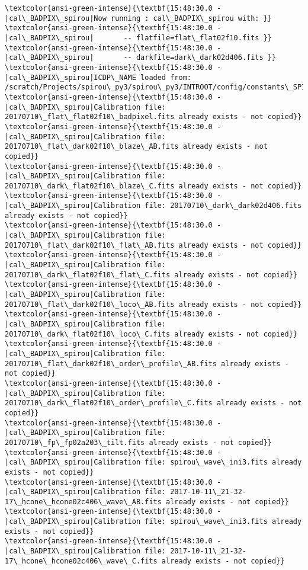\documentclass[11pt]{article}
\begin{document}
    \begin{Verbatim}[commandchars=\\\{\}]
\textcolor{ansi-green-intense}{\textbf{15:48:30.0 -   |cal\_BADPIX\_spirou|Now running : cal\_BADPIX\_spirou with: }}
\textcolor{ansi-green-intense}{\textbf{15:48:30.0 -   |cal\_BADPIX\_spirou|       -- flatfile=flat\_flat02f10.fits }}
\textcolor{ansi-green-intense}{\textbf{15:48:30.0 -   |cal\_BADPIX\_spirou|       -- darkfile=dark\_dark02d406.fits }}
\textcolor{ansi-green-intense}{\textbf{15:48:30.0 -   |cal\_BADPIX\_spirou|ICDP\_NAME loaded from: /scratch/Projects/spirou\_py3/spirou\_py3/INTROOT/config/constants\_SPIROU.py}}
\textcolor{ansi-green-intense}{\textbf{15:48:30.0 -   |cal\_BADPIX\_spirou|Calibration file: 20170710\_flat\_flat02f10\_badpixel.fits already exists - not copied}}
\textcolor{ansi-green-intense}{\textbf{15:48:30.0 -   |cal\_BADPIX\_spirou|Calibration file: 20170710\_flat\_dark02f10\_blaze\_AB.fits already exists - not copied}}
\textcolor{ansi-green-intense}{\textbf{15:48:30.0 -   |cal\_BADPIX\_spirou|Calibration file: 20170710\_dark\_flat02f10\_blaze\_C.fits already exists - not copied}}
\textcolor{ansi-green-intense}{\textbf{15:48:30.0 -   |cal\_BADPIX\_spirou|Calibration file: 20170710\_dark\_dark02d406.fits already exists - not copied}}
\textcolor{ansi-green-intense}{\textbf{15:48:30.0 -   |cal\_BADPIX\_spirou|Calibration file: 20170710\_flat\_dark02f10\_flat\_AB.fits already exists - not copied}}
\textcolor{ansi-green-intense}{\textbf{15:48:30.0 -   |cal\_BADPIX\_spirou|Calibration file: 20170710\_dark\_flat02f10\_flat\_C.fits already exists - not copied}}
\textcolor{ansi-green-intense}{\textbf{15:48:30.0 -   |cal\_BADPIX\_spirou|Calibration file: 20170710\_flat\_dark02f10\_loco\_AB.fits already exists - not copied}}
\textcolor{ansi-green-intense}{\textbf{15:48:30.0 -   |cal\_BADPIX\_spirou|Calibration file: 20170710\_dark\_flat02f10\_loco\_C.fits already exists - not copied}}
\textcolor{ansi-green-intense}{\textbf{15:48:30.0 -   |cal\_BADPIX\_spirou|Calibration file: 20170710\_flat\_dark02f10\_order\_profile\_AB.fits already exists - not copied}}
\textcolor{ansi-green-intense}{\textbf{15:48:30.0 -   |cal\_BADPIX\_spirou|Calibration file: 20170710\_dark\_flat02f10\_order\_profile\_C.fits already exists - not copied}}
\textcolor{ansi-green-intense}{\textbf{15:48:30.0 -   |cal\_BADPIX\_spirou|Calibration file: 20170710\_fp\_fp02a203\_tilt.fits already exists - not copied}}
\textcolor{ansi-green-intense}{\textbf{15:48:30.0 -   |cal\_BADPIX\_spirou|Calibration file: spirou\_wave\_ini3.fits already exists - not copied}}
\textcolor{ansi-green-intense}{\textbf{15:48:30.0 -   |cal\_BADPIX\_spirou|Calibration file: 2017-10-11\_21-32-17\_hcone\_hcone02c406\_wave\_AB.fits already exists - not copied}}
\textcolor{ansi-green-intense}{\textbf{15:48:30.0 -   |cal\_BADPIX\_spirou|Calibration file: spirou\_wave\_ini3.fits already exists - not copied}}
\textcolor{ansi-green-intense}{\textbf{15:48:30.0 -   |cal\_BADPIX\_spirou|Calibration file: 2017-10-11\_21-32-17\_hcone\_hcone02c406\_wave\_C.fits already exists - not copied}}

    \end{Verbatim}
\end{document}
